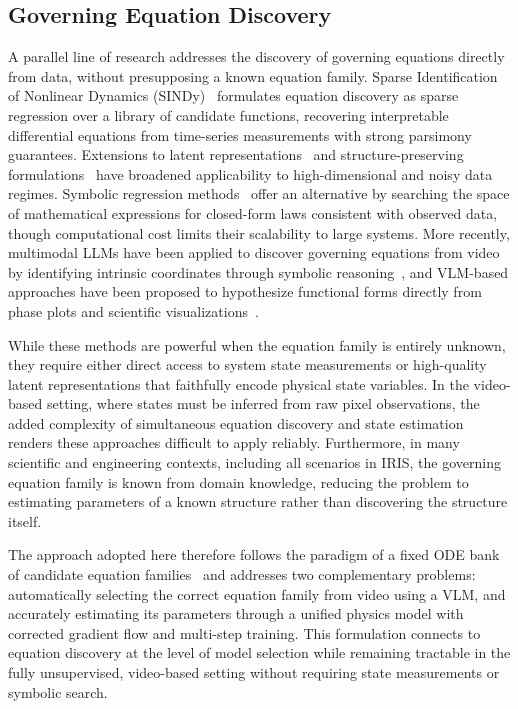 \documentclass[runningheads]{llncs}
\begin{document}
\subsection{Governing Equation Discovery}
\label{sec:related_eq_discovery}

A parallel line of research addresses the discovery of governing equations directly from data, without presupposing a known equation family. Sparse Identification of Nonlinear Dynamics (SINDy)~\cite{brunton2016discovering} formulates equation discovery as sparse regression over a library of candidate functions, recovering interpretable differential equations from time-series measurements with strong parsimony guarantees. Extensions to latent representations~\cite{champion2019data} and structure-preserving formulations~\cite{lee2022structure} have broadened applicability to high-dimensional and noisy data regimes. Symbolic regression methods~\cite{Schmidt2009DistillingFN} offer an alternative by searching the space of mathematical expressions for closed-form laws consistent with observed data, though computational cost limits their scalability to large systems. More recently, multimodal LLMs have been applied to discover governing equations from video by identifying intrinsic coordinates through symbolic reasoning~\cite{li2025mllmbaseddiscoveryintrinsiccoordinates}, and VLM-based approaches have been proposed to hypothesize functional forms directly from phase plots and scientific visualizations~\cite{liu2025mimicking}.

While these methods are powerful when the equation family is entirely unknown, they require either direct access to system state measurements or high-quality latent representations that faithfully encode physical state variables. In the video-based setting, where states must be inferred from raw pixel observations, the added complexity of simultaneous equation discovery and state estimation renders these approaches difficult to apply reliably. Furthermore, in many scientific and engineering contexts, including all scenarios in IRIS, the governing equation family is known from domain knowledge, reducing the problem to estimating parameters of a known structure rather than discovering the structure itself.

The approach adopted here therefore follows the paradigm of a fixed ODE bank of candidate equation families~\cite{hofherr2023neural, jaques2019physics} and addresses two complementary problems: automatically selecting the correct equation family from video using a VLM, and accurately estimating its parameters through a unified physics model with corrected gradient flow and multi-step training. This formulation connects to equation discovery at the level of model selection while remaining tractable in the fully unsupervised, video-based setting without requiring state measurements or symbolic search.
\end{document}
